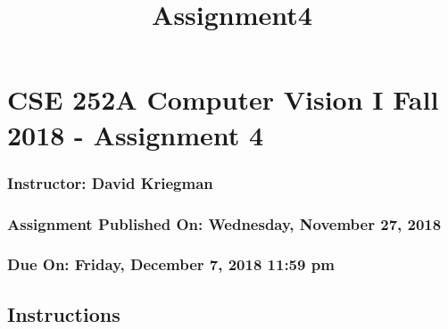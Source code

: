 \documentclass[11pt]{article}
\title{Assignment4 }
\begin{document}
    
    
    \maketitle
    
    

    
    \hypertarget{cse-252a-computer-vision-i-fall-2018---assignment-4}{%
\section{CSE 252A Computer Vision I Fall 2018 - Assignment
4}\label{cse-252a-computer-vision-i-fall-2018---assignment-4}}

\hypertarget{instructor-david-kriegman}{%
\subsubsection{Instructor: David
Kriegman}\label{instructor-david-kriegman}}

\hypertarget{assignment-published-on-wednesday-november-27-2018}{%
\subsubsection{Assignment Published On: Wednesday, November 27,
2018}\label{assignment-published-on-wednesday-november-27-2018}}

\hypertarget{due-on-friday-december-7-2018-1159-pm}{%
\subsubsection{Due On: Friday, December 7, 2018 11:59
pm}\label{due-on-friday-december-7-2018-1159-pm}}

\hypertarget{instructions}{%
\subsection{Instructions}\label{instructions}}
\end{document}
